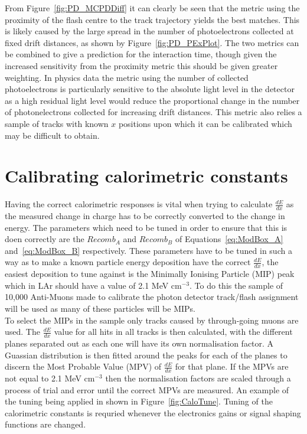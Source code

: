 From Figure~\ref{fig:PD_MCPDDiff} it can clearly be seen that the metric using the proximity of the flash centre to the track trajectory yields the best matches. This is likely caused by the large spread in the number of photoelectrons collected at fixed drift distances, as shown by Figure~\ref{fig:PD_PExPlot}. The two metrics can be combined to give a prediction for the interaction time, though given the increased sensitivity from the proximity metric this should be given greater weighting. In physics data the metric using the number of collected photoelectrons is particularly sensitive to the absolute light level in the detector as a high residual light level would reduce the proportional change in the number of photonelectrons collected for increasing drift distances. This metric also relies a sample of tracks with known $x$ positions upon which it can be calibrated which may be difficult to obtain. \\



\section{Calibrating calorimetric constants}  %
Having the correct calorimetric responses is vital when trying to calculate $\frac{dE}{dx}$ as the measured change in charge has to be correctly converted to the change in energy. The parameters which need to be tuned in order to ensure that this is doen correctly are the $Recomb_A$ and $Recomb_B$ of Equations~\ref{eq:ModBox_A} and~\ref{eq:ModBox_B} respectively. These parameters have to be tuned in such a way as to make a known particle energy deposition have the correct $\frac{dE}{dx}$, the easiest deposition to tune against is the Minimally Ionising Particle (MIP) peak which in LAr should have a value of 2.1 MeV cm$^{-3}$. To do this the sample of 10,000 Anti-Muons made to calibrate the photon detector track/flash assignment will be used as many of these particles will be MIPs. \\

To select the MIPs in the sample only tracks caused by through-going muons are used. The $\frac{dE}{dx}$ value for all hits in all tracks is then calculated, with the different planes separated out as each one will have its own normalisation factor. A Guassian distribution is then fitted around the peaks for each of the planes to discern the Most Probable Value (MPV) of $\frac{dE}{dx}$ for that plane. If the MPVs are not equal to 2.1 MeV cm$^{-3}$ then the normalisation factors are scaled through a process of trial and error until the correct MPVs are measured. An example of the tuning being applied in shown in Figure~\ref{fig:CaloTune}. Tuning of the calorimetric constants is requried whenever the electronics gains or signal shaping functions are changed.

